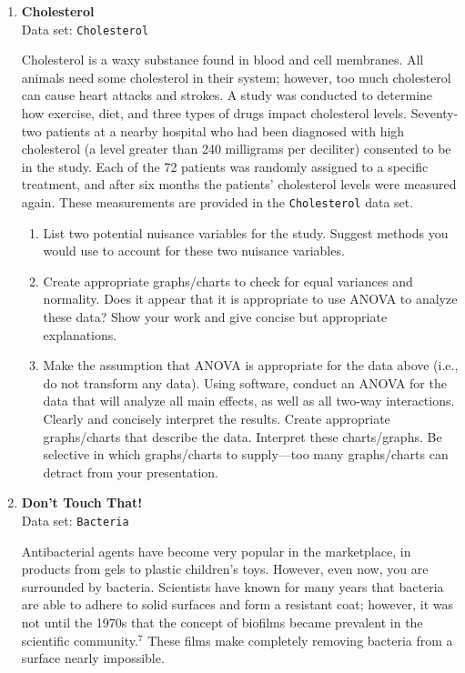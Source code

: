 \documentclass[
]{book}
\begin{document}
\begin{enumerate}
  \item \textbf{Cholesterol}\\
  Data set: \texttt{Cholesterol}

Cholesterol is a waxy substance found in blood and cell membranes. All animals need some cholesterol in their system; however, too much cholesterol can cause heart attacks and strokes. A study was conducted to determine how exercise, diet, and three types of drugs impact cholesterol levels. Seventy-two patients at a nearby hospital who had been diagnosed with high cholesterol (a level greater than 240 milligrams per deciliter) consented to be in the study. Each of the 72 patients was randomly assigned to a specific treatment, and after six months the patients’ cholesterol levels were measured again. These measurements are provided in the \texttt{Cholesterol} data set.

  \begin{enumerate}
    \item List two potential nuisance variables for the study. Suggest methods you would use to account for these two nuisance variables.
    \item Create appropriate graphs/charts to check for equal variances and normality. Does it appear that it is appropriate to use ANOVA to analyze these data? Show your work and give concise but appropriate explanations.
    \item Make the assumption that ANOVA is appropriate for the data above (i.e., do not transform any data). Using software, conduct an ANOVA for the data that will analyze all main effects, as well as all two-way interactions. Clearly and concisely interpret the results. Create appropriate graphs/charts that describe the data. Interpret these charts/graphs. Be selective in which graphs/charts to supply---too many graphs/charts can detract from your presentation.
  \end{enumerate}

  \item \textbf{Don't Touch That!}\\
  Data set: \texttt{Bacteria}

Antibacterial agents have become very popular in the marketplace, in products from gels to plastic children’s toys. However, even now, you are surrounded by bacteria. Scientists have known for many years that bacteria are able to adhere to solid surfaces and form a resistant coat; however, it was not until the 1970s that the concept of biofilms became prevalent in the scientific community.$^7$ These films make completely removing bacteria from a surface nearly impossible.


\end{enumerate}
\end{document}
